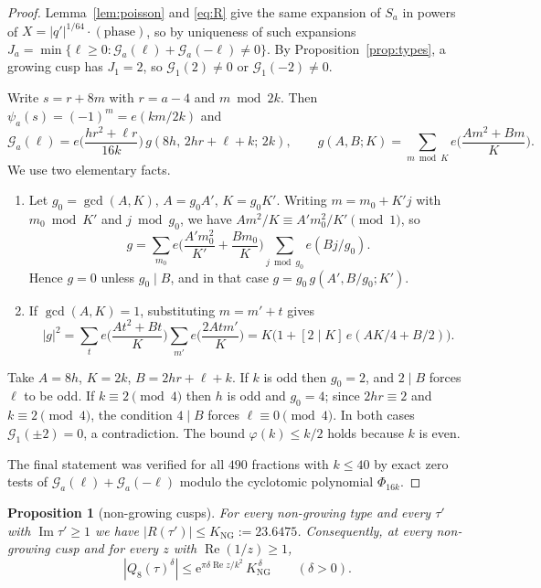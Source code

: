 \documentclass[11pt]{amsart}
\newtheorem{proposition}[theorem]{Proposition}
\theoremstyle{remark}
\theoremstyle{definition}
\newcommand{\cG}{\mathcal G}
\newcommand{\Rea}{\operatorname{Re}}
\newcommand{\Ima}{\operatorname{Im}}
\newcommand{\e}{\mathrm e}
\newcommand{\KNG}{K_{\mathrm{NG}}}
\begin{document}
\begin{proof}
Lemma~\ref{lem:poisson} and \eqref{eq:R} give the same expansion of $S_a$ in powers of $X=|q'|^{1/64}\cdot(\text{phase})$, so by uniqueness of such expansions $J_a=\min\{\ell\ge0:\cG_a(\ell)+\cG_a(-\ell)\ne0\}$. By Proposition~\ref{prop:types}, a growing cusp has $J_1=2$, so $\cG_1(2)\ne0$ or $\cG_1(-2)\ne0$.

Write $s=r+8m$ with $r=a-4$ and $m\bmod2k$. Then $\psi_a(s)=(-1)^m=e(km/2k)$ and
\[
\cG_a(\ell)=e\Big(\frac{hr^2+\ell r}{16k}\Big)\,g(8h,\,2hr+\ell+k;\,2k),\qquad g(A,B;K)=\sum_{m\bmod K}e\Big(\frac{Am^2+Bm}K\Big).
\]
We use two elementary facts.
\begin{enumerate}[label=(\roman*),leftmargin=2em]
\item Let $g_0=\gcd(A,K)$, $A=g_0A'$, $K=g_0K'$. Writing $m=m_0+K'j$ with $m_0\bmod K'$ and $j\bmod g_0$, we have $Am^2/K\equiv A'm_0^2/K'\pmod1$, so
\[
g=\sum_{m_0}e\Big(\frac{A'm_0^2}{K'}+\frac{Bm_0}K\Big)\sum_{j\bmod g_0}e(Bj/g_0).
\]
Hence $g=0$ unless $g_0\mid B$, and in that case $g=g_0\,g(A',B/g_0;K')$.
\item If $\gcd(A,K)=1$, substituting $m=m'+t$ gives
\[
|g|^2=\sum_te\Big(\frac{At^2+Bt}K\Big)\sum_{m'}e\Big(\frac{2Atm'}K\Big)=K\big(1+[2\mid K]\,e(AK/4+B/2)\big).
\]
\end{enumerate}
Take $A=8h$, $K=2k$, $B=2hr+\ell+k$. If $k$ is odd then $g_0=2$, and $2\mid B$ forces $\ell$ to be odd. If $k\equiv2\pmod4$ then $h$ is odd and $g_0=4$; since $2hr\equiv2$ and $k\equiv2\pmod4$, the condition $4\mid B$ forces $\ell\equiv0\pmod4$. In both cases $\cG_1(\pm2)=0$, a contradiction. The bound $\varphi(k)\le k/2$ holds because $k$ is even.

The final statement was verified for all $490$ fractions with $k\le40$ by exact zero tests of $\cG_a(\ell)+\cG_a(-\ell)$ modulo the cyclotomic polynomial $\Phi_{16k}$.
\end{proof}

\begin{proposition}[non-growing cusps]\label{prop:KNG}
For every non-growing type and every $\tau'$ with $\Ima\tau'\ge1$ we have $|R(\tau')|\le\KNG:=23.6475$. Consequently, at every non-growing cusp and for every $z$ with $\Rea(1/z)\ge1$,
\[
|Q_8(\tau)^\delta|\le\e^{\pi\delta\Rea z/k^2}\,\KNG^{\,\delta}\qquad(\delta>0).
\]
\end{proposition}
\end{document}
